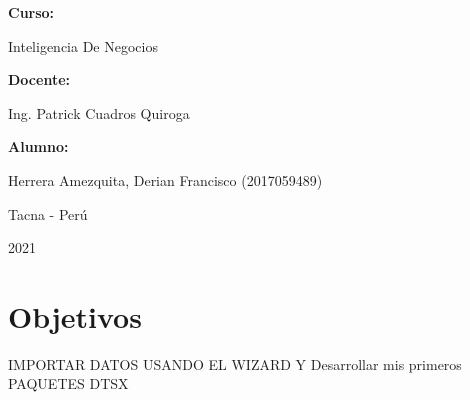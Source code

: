 \documentclass[12pt,letterpaper]{article}
\begin{document}
\begin{titlepage}
\begin{center}
\vspace*{0.3in}
\begin{Large}
\textbf{Curso:} \\
\end{Large}

\vspace*{0.1in}
\begin{large}
    Inteligencia De Negocios\\
\end{large}

\vspace*{0.3in}
\begin{Large}
\textbf{Docente:} \\
\end{Large}

\vspace*{0.1in}
\begin{large}
Ing. Patrick Cuadros Quiroga\\
\end{large}

\vspace*{0.2in}
\vspace*{0.1in}
\begin{large}
\textbf{Alumno:} \\
\begin{flushleft}
Herrera Amezquita, Derian Francisco		\hfill	(2017059489) \\


\end{flushleft}
\end{large}
\vspace*{0.1in}
\begin{large}
Tacna - Perú\\
\end{large}
\vspace*{0.1in}
\begin{large}
2021\\
\end{large}

\end{center}

\end{titlepage}



\tableofcontents %
\thispagestyle{empty} %
\newpage
\setcounter{page}{1} %


\section{Objetivos}
IMPORTAR DATOS USANDO EL WIZARD Y Desarrollar mis primeros PAQUETES DTSX
\end{document}
